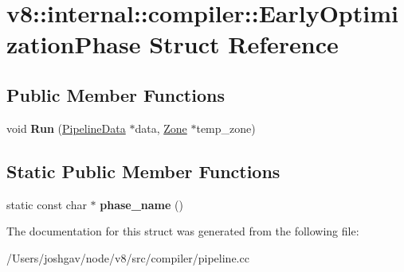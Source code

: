 \hypertarget{structv8_1_1internal_1_1compiler_1_1_early_optimization_phase}{}\section{v8\+:\+:internal\+:\+:compiler\+:\+:Early\+Optimization\+Phase Struct Reference}
\label{structv8_1_1internal_1_1compiler_1_1_early_optimization_phase}
\subsection*{Public Member Functions}
\begin{DoxyCompactItemize}
\item 
void {\bfseries Run} (\hyperlink{classv8_1_1internal_1_1compiler_1_1_pipeline_data}{Pipeline\+Data} $\ast$data, \hyperlink{classv8_1_1internal_1_1_zone}{Zone} $\ast$temp\+\_\+zone)\hypertarget{structv8_1_1internal_1_1compiler_1_1_early_optimization_phase_a630e0af9a616620e86a5c98cbeb6f0bc}{}\label{structv8_1_1internal_1_1compiler_1_1_early_optimization_phase_a630e0af9a616620e86a5c98cbeb6f0bc}

\end{DoxyCompactItemize}
\subsection*{Static Public Member Functions}
\begin{DoxyCompactItemize}
\item 
static const char $\ast$ {\bfseries phase\+\_\+name} ()\hypertarget{structv8_1_1internal_1_1compiler_1_1_early_optimization_phase_aa9ed0b2d039addf569bee53b1e84f1dd}{}\label{structv8_1_1internal_1_1compiler_1_1_early_optimization_phase_aa9ed0b2d039addf569bee53b1e84f1dd}

\end{DoxyCompactItemize}


The documentation for this struct was generated from the following file\+:\begin{DoxyCompactItemize}
\item 
/\+Users/joshgav/node/v8/src/compiler/pipeline.\+cc\end{DoxyCompactItemize}
